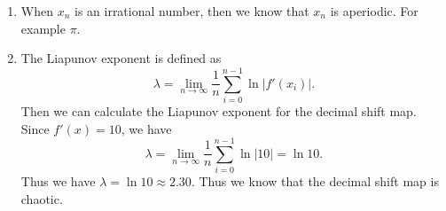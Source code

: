 \documentclass[12pt]{exam}
\begin{document}
\begin{enumerate}
	\item When $x_n$ is an irrational number, then we know that $x_n$ is aperiodic. For example $\pi$.
	
	\item The Liapunov exponent is defined as
		\[ \lambda = \lim_{n\to\infty} \frac{1}{n} \sum_{i=0}^{n-1} \ln |f'(x_i)| .\]
		Then we can calculate the Liapunov exponent for the decimal shift map. Since $f'(x) = 10$, we have
		\[ \lambda = \lim_{n\to\infty} \frac{1}{n} \sum_{i=0}^{n-1} \ln |10| = \ln 10 .\]
		Thus we have $\lambda = \ln 10 \approx 2.30$. Thus we know that the decimal shift map is chaotic.

\end{enumerate}
\end{document}
